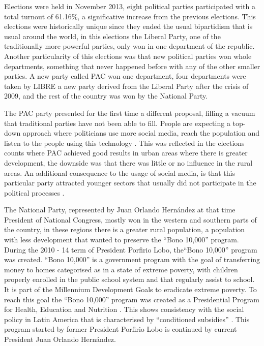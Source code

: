 \documentclass[letterpaper,10pt]{article}
\begin{document}
Elections were held in November 2013, eight political parties participated with a total turnout of 61.16\%, a significative increase from the previous elections. This elections were historically unique since they ended the usual bipartidism that is usual around the world, in this elections the Liberal Party, one of the traditionally more powerful parties, only won in one department of the republic. Another particularity of this elections was that new political parties won whole departments, something that never happened before with any of the other smaller parties. A new party called PAC won one department, four departments were taken by LIBRE a new party derived from the Liberal Party after the crisis of 2009, and the rest of the country was won by the National Party.

The PAC party presented for the first time a different proposal, filling a vacuum that traditional parties have not been able to fill. People are expecting a top-down approach where politicians use more social media, reach the population and listen to the people using this technology \citep{map2014}. This was reflected in the elections counts where PAC achieved good results in urban areas where there is greater development, the downside was that there was little or no influence in the rural areas. An additional consequence to the usage of social media, is that this particular party attracted younger sectors that usually did not participate in the political processes \citep{romero2014}.

The National Party, represented by Juan Orlando Hernández at that time President of National Congress, mostly won in the western and southern parts of the country, in these regions there is a greater rural population, a population with less development that wanted to preserve the ``Bono 10,000'' program. During the 2010 - 14 term of President Porfirio Lobo, the``Bono 10,000'' program was created. ``Bono 10,000'' is a government program with the goal of transferring money to homes categorised as in a state of extreme poverty, with children properly enrolled in the public school system and that regularly assist to school. It is part of the Millennium Development Goals \citep{mdg2006} to eradicate extreme poverty. To reach this goal the ``Bono 10,000'' program was created as a Presidential Program for Health, Education and Nutrition \citep{bono10k}. This shows consistency with the social policy in Latin America that is characterised by ``conditioned subsidies'' \citep{romero2014}. This program started by former President Porfirio Lobo is continued by current President Juan Orlando Hern\'{a}ndez. 
\end{document}
